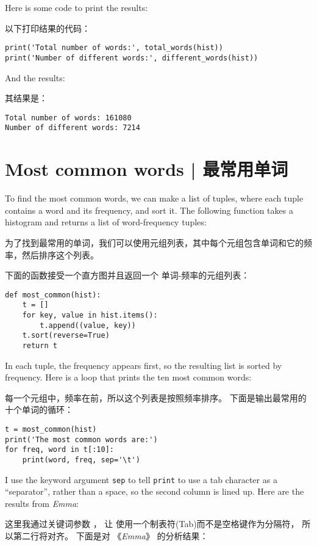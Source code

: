 %
Here is some code to print the results:

以下打印结果的代码：

\begin{lstlisting}
print('Total number of words:', total_words(hist))
print('Number of different words:', different_words(hist))
\end{lstlisting}

%
And the results:

其结果是：

\begin{lstlisting}
Total number of words: 161080
Number of different words: 7214
\end{lstlisting}

%
\section{Most common words  |  最常用单词}

To find the most common words, we can make a list of tuples,
where each tuple contains a word and its frequency,
and sort it.
The following function takes a histogram and returns a list of
word-frequency tuples:

为了找到最常用的单词，我们可以使用元组列表，其中每个元组包含单词和它的频率，然后排序这个列表。

下面的函数接受一个直方图并且返回一个
单词-频率的元组列表：

\begin{lstlisting}
def most_common(hist):
    t = []
    for key, value in hist.items():
        t.append((value, key))
    t.sort(reverse=True)
    return t
\end{lstlisting}

In each tuple, the frequency appears first, so the resulting list is
sorted by frequency.  Here is a loop that prints the ten most common
words:

每一个元组中，频率在前，所以这个列表是按照频率排序。
下面是输出最常用的十个单词的循环：

\begin{lstlisting}
t = most_common(hist)
print('The most common words are:')
for freq, word in t[:10]:
    print(word, freq, sep='\t')
\end{lstlisting}
%
I use the keyword argument {\tt sep} to tell {\tt print} to use a tab
character as a ``separator'', rather than a space, so the second
column is lined up.  Here are the results from {\em Emma}:

这里我通过关键词参数 ， 让  使用一个制表符(Tab)而不是空格键作为分隔符， 所以第二行将对齐。  下面是对 《{\em Emma}》 的分析结果：


